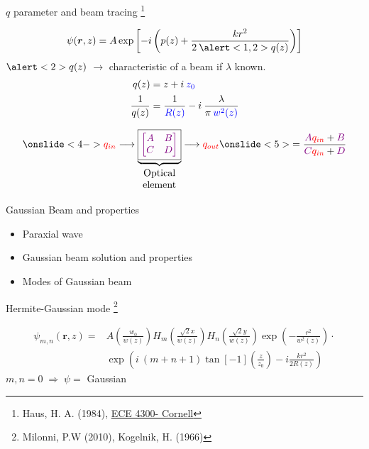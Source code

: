 \documentclass[12pt, dvipsnames]{beamer}
\numberwithin{equation}{section}
\newcommand\blfootnote[1]{%
	\begingroup
	\renewcommand\thefootnote{}\footnote{#1}%
	\addtocounter{footnote}{-1}%
	\endgroup
}
\begin{document}
\begin{frame}[t]{$q$ parameter and beam tracing}\blfootnote{Haus, H. A. (1984), \href{https://www.youtube.com/playlist?list=PLyWzPf87clvEb8T3Xf30tMaUqdbVchrNY}{ECE 4300- Cornell}}
	\vspace{-12pt}
	$$\psi(\boldsymbol{r},z)= A \exp\left[-i\left(p(z) + \frac{kr^2}{2\:\alert<1,2>{q(z)}}\right)\right]$$\pause
	$\alert<2>{q(z)}$ $\longrightarrow$ characteristic of a beam if $\lambda$ known.\pause
	\begin{align*}
		q(z) &= z + i\:\color{blue}z_0\\
		\frac{1}{q(z)} &= \frac{1}{\color{blue}R(z)} - i\: \frac{\lambda}{\pi\: \color{blue}w^2(z)}
	\end{align*}\pause

\begin{align*}\onslide<4->{{\color{red}q_{in}}\longrightarrow
	\underbrace{\boxed{\color{violet}{\begin{bmatrix}
		A&B\\
		C&D
	\end{bmatrix}}}}_{\begin{matrix}\text{Optical}\\ \text{element} \end{matrix}}
	\longrightarrow {\color{red}q_{out}}} \onslide<5>{= \frac{{\color{violet}A} {\color{red}q_{in}}+{\color{violet}B}}{{\color{violet}C} {\color{red}q_{in}}+ {\color{violet}D}}}
\end{align*}
\end{frame}

\begin{frame}%
	\centering
	\alert{\huge Gaussian Beam and properties}
	\begin{itemize}\Large
		\item<0>Paraxial wave
		\item<0>Gaussian beam solution and properties
		\item<1>Modes of Gaussian beam
	\end{itemize}
\end{frame}

\begin{frame}[c]{Hermite-Gaussian mode}\blfootnote{Milonni, P.W (2010), Kogelnik, H. (1966)}
	\begin{align*}
		\psi_{m,n}(\boldsymbol{r},z)=& A \left(\frac{w_0}{w(z)}\right) H_m\left(\frac{\sqrt{2} x}{w(z)}\right) H_n\left(\frac{\sqrt{2} y}{w(z)}\right)\exp( -\frac{r^2}{w^2(z)}) \cdot\nonumber\\ 
		&\exp( i\:(m+n+1)\tan[-1](\frac{z}{z_0}) -i\frac{kr^2}{2R(z)})
	\end{align*}\pause
	$m,n=0\;\Rightarrow\;\psi=$ \alert{Gaussian}
\end{frame}
\end{document}
